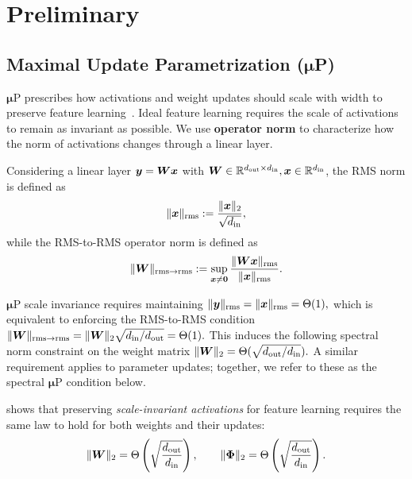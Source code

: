 
\section{Preliminary}



\subsection{Maximal Update Parametrization (\texorpdfstring{$\boldsymbol{\mu}$}{mu}P) }
\label{sec:bg_mup}

$\boldsymbol{\mu}$P prescribes how
activations and weight updates should scale with width to preserve feature learning~\citep{yang2023spectral}.
Ideal feature learning requires the scale of activations to remain as invariant as possible.
We use \textbf{operator norm} to characterize how the norm of activations changes through a linear layer.

Considering a linear layer ${\bm{y}}={\bm{W}}{\bm{x}}$ with
${\bm{W}}\in\mathbb{R}^{d_{\mathrm{out}}\times d_{\mathrm{in}}},{\bm{x}}\in\mathbb{R}^{d_{\mathrm{in}}}$, the RMS norm is defined as
\begin{equation}
\|{\bm{x}}\|_{\mathrm{rms}} := \frac{\|{\bm{x}}\|_2}{\sqrt{d_{\mathrm{in}}}},
\end{equation}
while the RMS-to-RMS operator norm is defined as
\begin{equation}
\|{\bm{W}}\|_{\mathrm{rms}\to\mathrm{rms}}
:= \sup_{{\bm{x}}\neq\bm{0}}
\frac{\|{\bm{W}}{\bm{x}}\|_{\mathrm{rms}}}{\|{\bm{x}}\|_{\mathrm{rms}}}.
\label{eq:rms_to_rms}
\end{equation}


$\boldsymbol{\mu}$P scale invariance requires maintaining
$\|{\bm{y}}\|_{\mathrm{rms}}=\|{\bm{x}}\|_{\mathrm{rms}}=\Theta(1),$
which is equivalent to enforcing the RMS-to-RMS condition
$\|{\bm{W}}\|_{\mathrm{rms}\to\mathrm{rms}}= \|{\bm{W}}\|_2\sqrt{{d_{\mathrm{in}}}/{d_{\mathrm{out}}}}=\Theta(1).$
This induces the following spectral norm constraint on the weight matrix
$
\|{\bm{W}}\|_2 = \Theta (\sqrt{{d_{\mathrm{out}}}/{d_{\mathrm{in}}}}).
$
A similar requirement applies to parameter updates; together, we refer to these as the spectral $\boldsymbol{\mu}$P condition below.


\begin{mdframed}[style=MyBoxStyle1, frametitle={Spectral $\boldsymbol{\mu}$P Condition}, nobreak=true]
\citet{yang2023spectral} shows that preserving \emph{scale-invariant activations} for feature learning requires the same law to hold for both weights and their updates:
\[
\|{\bm{W}}\|_2 = \Theta\left(\sqrt{\frac{d_{\mathrm{out}}}{d_{\mathrm{in}}}}\right),
\qquad
\|{\bm{\Phi}}\|_2 = \Theta\left(\sqrt{\frac{d_{\mathrm{out}}}{d_{\mathrm{in}}}}\right).
\]
\end{mdframed}



